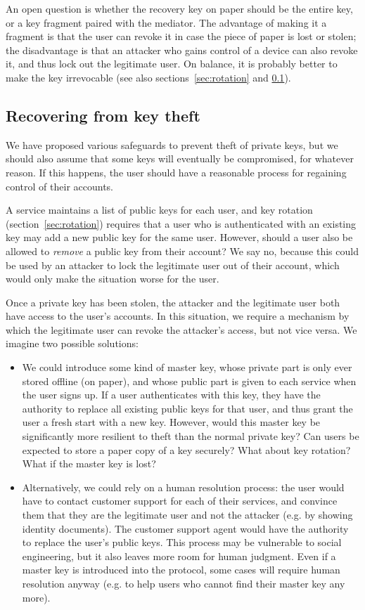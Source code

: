 An open question is whether the recovery key on paper should be the entire key, or a key fragment
paired with the mediator. The advantage of making it a fragment is that the user can revoke it in
case the piece of paper is lost or stolen; the disadvantage is that an attacker who gains control of
a device can also revoke it, and thus lock out the legitimate user. On balance, it is probably
better to make the key irrevocable (see also sections~\ref{sec:rotation} and \ref{sec:recovery}).

\subsection{Recovering from key theft}\label{sec:recovery}

We have proposed various safeguards to prevent theft of private keys, but we should also assume that
some keys will eventually be compromised, for whatever reason. If this happens, the user should have
a reasonable process for regaining control of their accounts.

A service maintains a list of public keys for each user, and key rotation
(section~\ref{sec:rotation}) requires that a user who is authenticated with an existing key may add
a new public key for the same user. However, should a user also be allowed to \emph{remove} a public
key from their account? We say no, because this could be used by an attacker to lock the legitimate
user out of their account, which would only make the situation worse for the user.

Once a private key has been stolen, the attacker and the legitimate user both have access to the
user's accounts. In this situation, we require a mechanism by which the legitimate user can revoke
the attacker's access, but not vice versa. We imagine two possible solutions:

\begin{itemize}
\item We could introduce some kind of master key, whose private part is only ever stored offline (on
paper), and whose public part is given to each service when the user signs up. If a user
authenticates with this key, they have the authority to replace all existing public keys for that
user, and thus grant the user a fresh start with a new key. However, would this master key be
significantly more resilient to theft than the normal private key? Can users be expected to store a
paper copy of a key securely? What about key rotation? What if the master key is lost?
\item Alternatively, we could rely on a human resolution process: the user would have to contact
customer support for each of their services, and convince them that they are the legitimate user and
not the attacker (e.g. by showing identity documents). The customer support agent would have the
authority to replace the user's public keys. This process may be vulnerable to social engineering,
but it also leaves more room for human judgment. Even if a master key is introduced into the
protocol, some cases will require human resolution anyway (e.g. to help users who cannot find their
master key any more).
\end{itemize}

